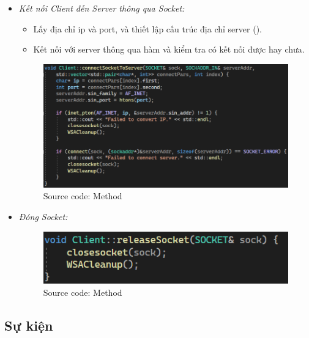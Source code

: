 \begin{itemize}
    \item \textit{Kết nối Client đến Server thông qua Socket:}
    \begin{itemize}
        \item Lấy địa chỉ ip và port, và thiết lập cấu trúc địa chỉ server (\textbf{}).
        \item  Kết nối với server thông qua hàm \textbf{} và kiểm tra có kết nối được hay chưa.
    \end{itemize}
        \begin{figure}[H]
	\begin{center}
		\includegraphics[scale=1]{img/connectSocket.png}
  \caption{Source code: Method \textbf{}}
	\end{center}	
    \end{figure}
    \item \textit{Đóng Socket:}
        \begin{figure}[H]
	\begin{center}
		\includegraphics[scale=1.5]{img/releaseSocket}
            \caption{Source code: Method \textbf{}}
	\end{center}
		
    \end{figure}
\end{itemize}





\subsection{Sự kiện} \label{events}
